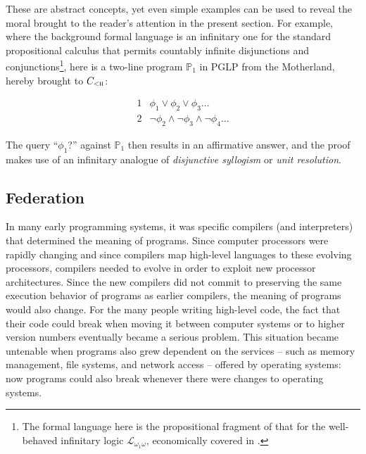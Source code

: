 \documentclass[]{article}
\begin{document}
These are abstract concepts, yet even simple examples can be used to
reveal the moral brought to the reader's attention in the present
section.  For example, where the background formal language is an
infinitary one for the standard propositional calculus that permits
countably infinite disjunctions and conjunctions\footnote{The formal
	language here is the propositional fragment of that for the
	well-behaved infinitary logic $\mathscr{L}_{\omega_1 \omega}$,
	economically covered in \cite{ebb.flum.thomas.2nded}.}, here is a
two-line program $\mathbb{P}_1$ in PGLP from the Motherland, hereby
brought to $C_\textsc{<h}$:

\medskip
$$
\begin{array}{l|l}
1 &  \phi_1 \vee \phi_2 \vee \phi_3 \ldots\\
2 & \neg \phi_2 \wedge \neg \phi_3 \wedge \neg \phi_4 \ldots
\end{array}
$$
\medskip

\noindent
%
The query ``$\phi_1$?'' against $\mathbb{P}_1$ then results in an
affirmative answer, and the proof makes use of an infinitary analogue
of \textit{disjunctive syllogism} or \textit{unit resolution}.


\subsection{Federation}


{\color{red}{this passage is inspired by Dale's note}}


In many early programming systems, it was specific compilers (and interpreters) that determined the meaning of programs. Since computer processors were rapidly changing and since compilers map high-level languages to these evolving processors, compilers needed to evolve in order to exploit new processor architectures. Since the new compilers did not commit to preserving the same execution behavior of programs
as earlier compilers, the meaning of programs would also change. For
the many people writing high-level code, the fact that their code
could break when moving it between computer systems or to higher
version numbers eventually became a serious problem. This situation
became untenable when programs also grew dependent on the
services -- such as memory management, file systems, and network
access -- offered by operating systems: now programs could also break
whenever there were changes to operating systems.
\end{document}
